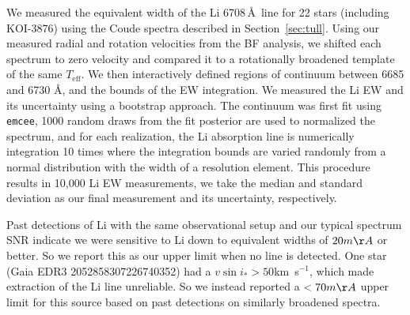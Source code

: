 \documentclass[twocolumn]{aastex631}
\newcommand{\name}{KOI-3876}
\newcommand{\vsini}{$v\sin{i_*}$}
\newcommand{\teff}{\ensuremath{T_{\text{eff}}}}
\newcommand\kms{km~s$^{-1}$}
\begin{document}


We measured the equivalent width of the Li 6708\,\AA\ line for 22 stars (including \name) using the Coude spectra described in Section~\ref{sec:tull}. Using our measured radial and rotation velocities from the BF analysis, we shifted each spectrum to zero velocity and compared it to a rotationally broadened template of the same \teff. We then interactively defined regions of continuum between 6685 and 6730 \AA, and the bounds of the EW integration. We measured the Li EW and its uncertainty using a bootstrap approach. The continuum was first fit using {\tt emcee}, 1000 random draws from the fit posterior are used to normalized the spectrum, and for each realization, the Li absorption line is numerically integration 10 times where the integration bounds are varied randomly from a normal distribution with the width of a resolution element. This procedure results in 10,000 Li EW measurements, we take the median and standard deviation as our final measurement and its uncertainty, respectively.  

Past detections of Li with the same observational setup and our typical spectrum SNR indicate we were sensitive to Li down to equivalent widths of $20m\AA$ or better. So we report this as our upper limit when no line is detected. One star (Gaia EDR3 2052858307226740352) had a \vsini$>50$\kms, which made extraction of the Li line unreliable. So we instead reported a $<70m\AA$ upper limit for this source based on past detections on similarly broadened spectra. 
\end{document}
